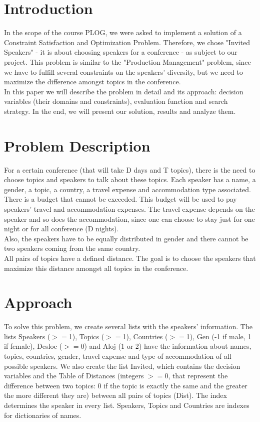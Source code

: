 \documentclass[runningheads,a4paper]{llncs}
\begin{document}
\section{Introduction}

In the scope of the course PLOG, we were asked to implement a solution of a Constraint Satisfaction and Optimization Problem. Therefore, we chose "Invited Speakers" - it is about choosing speakers for a conference - as subject to our project. This problem is similar to the "Production Management" problem, since we have to fulfill several constraints on the speakers’ diversity, but we need to maximize the difference amongst topics in the conference.\\
In this paper we will describe the problem in detail and its approach: decision variables (their domains and constraints), evaluation function and search strategy. In the end, we will present our solution, results and analyze them.


\section{Problem Description}

For a certain conference (that will take D days and T topics), there is the need to choose topics and speakers to talk about these topics. Each speaker has a name, a gender, a topic, a country, a travel expense and accommodation type associated.\\
There is a budget that cannot be exceeded. This budget will be used to pay speakers’ travel and accommodation expenses. The travel expense depends on the speaker and so does the accommodation, since one can choose to stay just for one night or for all conference (D nights).\\
Also, the speakers have to be equally distributed in gender and there cannot be two speakers coming from the same country. \\
All pairs of topics have a defined distance. The goal is to choose the speakers that maximize this distance amongst all topics in the conference.

\section{Approach}

To solve this problem, we create several lists with the speakers’ information. The lists Speakers ($>=$1), Topics ($>=$1), Countries ($>=$1), Gen (-1 if male, 1 if female), Desloc ($>=$0) and Aloj (1 or 2) have the information about names, topics, countries, gender, travel expense and type of accommodation of all possible speakers. We also create the list Invited, which contains the decision variables and the Table of Distances (integers $>=0$, that represent the difference between two topics: 0 if the topic is exactly the same and the greater the more different they are) between all pairs of topics (Dist). The index determines the speaker in every list. Speakers, Topics and Countries are indexes for dictionaries of names.
\end{document}
